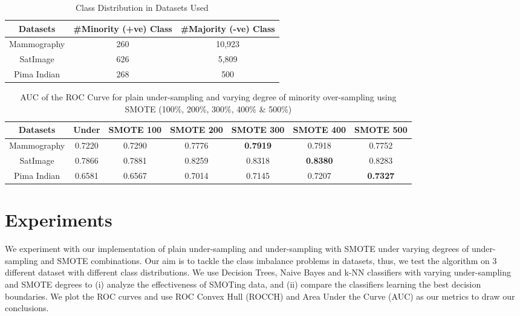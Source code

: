 \documentclass[10pt,journal,compsoc]{IEEEtran}
\begin{document}
\begin{table}[!t]
    \centering
    \begin{tabular}{|c||c|c|}
    	\hline
         Datasets & \#Minority (+ve) Class & \#Majority (-ve) Class  \\ \hline \hline  
        Mammography & 260 & 10,923 \\ \hline
        SatImage & 626 & 5,809 \\ \hline 
        Pima Indian & 268 & 500 \\ \hline
    \end{tabular}
    \caption{Class Distribution in Datasets Used}
    \label{tab:dataset}
\end{table}

\begin{table}[t]
    \centering
    \begin{tabular}{|c||c|c|c|c|c|c|}
    	\hline
         Datasets & Under & SMOTE 100 & SMOTE 200 & SMOTE 300 & SMOTE 400 & SMOTE 500  \\ \hline \hline  
        Mammography &  0.7220 & 0.7290 & 0.7776 & \textbf{0.7919} & 0.7918 & 0.7752 \\ \hline
        SatImage & 0.7866 & 0.7881 & 0.8259 & 0.8318 & \textbf{0.8380} & 0.8283 \\ \hline 
        Pima Indian & 0.6581 & 0.6567 & 0.7014 &  0.7145 & 0.7207 & \textbf{0.7327} \\ \hline
    \end{tabular}
    \caption{AUC of the ROC Curve for plain under-sampling and varying degree of minority over-sampling using SMOTE (100\%, 200\%, 300\%, 400\% \& 500\%)}
    \label{tab:auc}
\end{table}


\section{Experiments}
\label{sec:exp}
We experiment with our implementation of plain under-sampling and under-sampling with SMOTE under varying degrees of under-sampling and SMOTE combinations.   
Our aim is to tackle the class imbalance problems in datasets, thus, we test the algorithm on 3 different dataset with different class distributions.
We use Decision Trees, Naive Bayes and k-NN classifiers with varying under-sampling and SMOTE degrees to (i) analyze the effectiveness of SMOTing data, and (ii) compare the classifiers learning the best decision boundaries.
We plot the ROC curves and use ROC Convex Hull (ROCCH) and Area Under the Curve (AUC) as our metrics to draw our conclusions.
\end{document}
